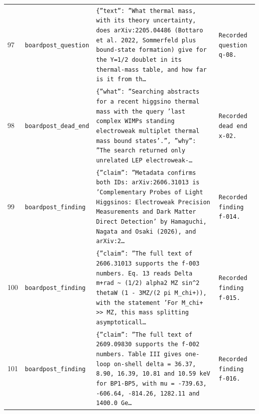 \documentclass[11pt,a4paper]{article}
\begin{document}
\begin{longtable}{@{}p{}p{}p{}p{}@{}}
97 & \texttt{board}\newline\texttt{post\_\allowbreak{}question} & \texttt{\{''text'':\allowbreak{} ''What thermal mass,\allowbreak{} with its theory uncertainty,\allowbreak{} does arXiv:\allowbreak{}2205.04486 (Bottaro et al. 2022,\allowbreak{} Sommerfeld plus bound-state formation)\allowbreak{} give for the Y=\allowbreak{}1/\allowbreak{}2 doublet in its thermal-mass table,\allowbreak{} and how far is it from th\ldots{}\allowbreak{}} & \texttt{Recorded question q-08.} \\
98 & \texttt{board}\newline\texttt{post\_\allowbreak{}dead\_\allowbreak{}end} & \texttt{\{''what'':\allowbreak{} ''Searching abstracts for a recent higgsino thermal mass with the query 'last complex WIMPs standing electroweak multiplet thermal mass bound states'.'',\allowbreak{} ''why'':\allowbreak{} ''The search returned only unrelated LEP electroweak-\ldots{}\allowbreak{}} & \texttt{Recorded dead end x-02.} \\
99 & \texttt{board}\newline\texttt{post\_\allowbreak{}finding} & \texttt{\{''claim'':\allowbreak{} ''Metadata confirms both IDs:\allowbreak{} arXiv:\allowbreak{}2606.31013 is 'Complementary Probes of Light Higgsinos:\allowbreak{} Electroweak Precision Measurements and Dark Matter Direct Detection' by Hamaguchi,\allowbreak{} Nagata and Osaki (2026)\allowbreak{},\allowbreak{} and arXiv:\allowbreak{}2\ldots{}\allowbreak{}} & \texttt{Recorded finding f-014.} \\
100 & \texttt{board}\newline\texttt{post\_\allowbreak{}finding} & \texttt{\{''claim'':\allowbreak{} ''The full text of 2606.31013 supports the f-003 numbers. Eq. 13 reads Delta m+\textbar{}\allowbreak{}rad \textasciitilde{}\allowbreak{} (1/\allowbreak{}2)\allowbreak{} alpha2 MZ sin\textasciicircum{}\allowbreak{}2 thetaW (1 - 3MZ/\allowbreak{}(2 pi M\_\allowbreak{}chi+)\allowbreak{})\allowbreak{},\allowbreak{} with the statement 'For M\_\allowbreak{}chi+ \textgreater{}\allowbreak{}\textgreater{}\allowbreak{} MZ,\allowbreak{} this mass splitting asymptoticall\ldots{}\allowbreak{}} & \texttt{Recorded finding f-015.} \\
101 & \texttt{board}\newline\texttt{post\_\allowbreak{}finding} & \texttt{\{''claim'':\allowbreak{} ''The full text of 2609.09830 supports the f-002 numbers. Table III gives one-loop on-shell delta =\allowbreak{} 36.37,\allowbreak{} 8.90,\allowbreak{} 16.39,\allowbreak{} 10.81 and 10.59 keV for BP1-BP5,\allowbreak{} with mu =\allowbreak{} -739.63,\allowbreak{} -606.64,\allowbreak{} -814.26,\allowbreak{} 1282.11 and 1400.0 Ge\ldots{}\allowbreak{}} & \texttt{Recorded finding f-016.} \\

\end{longtable}
\end{document}

